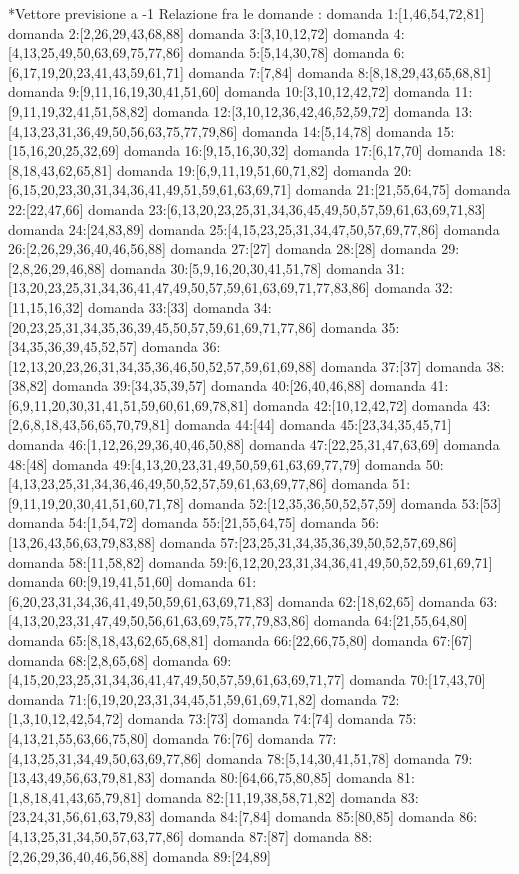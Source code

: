 *Vettore previsione a -1
Relazione fra le domande :
domanda 1:[1,46,54,72,81]
domanda 2:[2,26,29,43,68,88]
domanda 3:[3,10,12,72]
domanda 4:[4,13,25,49,50,63,69,75,77,86]
domanda 5:[5,14,30,78]
domanda 6:[6,17,19,20,23,41,43,59,61,71]
domanda 7:[7,84]
domanda 8:[8,18,29,43,65,68,81]
domanda 9:[9,11,16,19,30,41,51,60]
domanda 10:[3,10,12,42,72]
domanda 11:[9,11,19,32,41,51,58,82]
domanda 12:[3,10,12,36,42,46,52,59,72]
domanda 13:[4,13,23,31,36,49,50,56,63,75,77,79,86]
domanda 14:[5,14,78]
domanda 15:[15,16,20,25,32,69]
domanda 16:[9,15,16,30,32]
domanda 17:[6,17,70]
domanda 18:[8,18,43,62,65,81]
domanda 19:[6,9,11,19,51,60,71,82]
domanda 20:[6,15,20,23,30,31,34,36,41,49,51,59,61,63,69,71]
domanda 21:[21,55,64,75]
domanda 22:[22,47,66]
domanda 23:[6,13,20,23,25,31,34,36,45,49,50,57,59,61,63,69,71,83]
domanda 24:[24,83,89]
domanda 25:[4,15,23,25,31,34,47,50,57,69,77,86]
domanda 26:[2,26,29,36,40,46,56,88]
domanda 27:[27]
domanda 28:[28]
domanda 29:[2,8,26,29,46,88]
domanda 30:[5,9,16,20,30,41,51,78]
domanda 31:[13,20,23,25,31,34,36,41,47,49,50,57,59,61,63,69,71,77,83,86]
domanda 32:[11,15,16,32]
domanda 33:[33]
domanda 34:[20,23,25,31,34,35,36,39,45,50,57,59,61,69,71,77,86]
domanda 35:[34,35,36,39,45,52,57]
domanda 36:[12,13,20,23,26,31,34,35,36,46,50,52,57,59,61,69,88]
domanda 37:[37]
domanda 38:[38,82]
domanda 39:[34,35,39,57]
domanda 40:[26,40,46,88]
domanda 41:[6,9,11,20,30,31,41,51,59,60,61,69,78,81]
domanda 42:[10,12,42,72]
domanda 43:[2,6,8,18,43,56,65,70,79,81]
domanda 44:[44]
domanda 45:[23,34,35,45,71]
domanda 46:[1,12,26,29,36,40,46,50,88]
domanda 47:[22,25,31,47,63,69]
domanda 48:[48]
domanda 49:[4,13,20,23,31,49,50,59,61,63,69,77,79]
domanda 50:[4,13,23,25,31,34,36,46,49,50,52,57,59,61,63,69,77,86]
domanda 51:[9,11,19,20,30,41,51,60,71,78]
domanda 52:[12,35,36,50,52,57,59]
domanda 53:[53]
domanda 54:[1,54,72]
domanda 55:[21,55,64,75]
domanda 56:[13,26,43,56,63,79,83,88]
domanda 57:[23,25,31,34,35,36,39,50,52,57,69,86]
domanda 58:[11,58,82]
domanda 59:[6,12,20,23,31,34,36,41,49,50,52,59,61,69,71]
domanda 60:[9,19,41,51,60]
domanda 61:[6,20,23,31,34,36,41,49,50,59,61,63,69,71,83]
domanda 62:[18,62,65]
domanda 63:[4,13,20,23,31,47,49,50,56,61,63,69,75,77,79,83,86]
domanda 64:[21,55,64,80]
domanda 65:[8,18,43,62,65,68,81]
domanda 66:[22,66,75,80]
domanda 67:[67]
domanda 68:[2,8,65,68]
domanda 69:[4,15,20,23,25,31,34,36,41,47,49,50,57,59,61,63,69,71,77]
domanda 70:[17,43,70]
domanda 71:[6,19,20,23,31,34,45,51,59,61,69,71,82]
domanda 72:[1,3,10,12,42,54,72]
domanda 73:[73]
domanda 74:[74]
domanda 75:[4,13,21,55,63,66,75,80]
domanda 76:[76]
domanda 77:[4,13,25,31,34,49,50,63,69,77,86]
domanda 78:[5,14,30,41,51,78]
domanda 79:[13,43,49,56,63,79,81,83]
domanda 80:[64,66,75,80,85]
domanda 81:[1,8,18,41,43,65,79,81]
domanda 82:[11,19,38,58,71,82]
domanda 83:[23,24,31,56,61,63,79,83]
domanda 84:[7,84]
domanda 85:[80,85]
domanda 86:[4,13,25,31,34,50,57,63,77,86]
domanda 87:[87]
domanda 88:[2,26,29,36,40,46,56,88]
domanda 89:[24,89]

